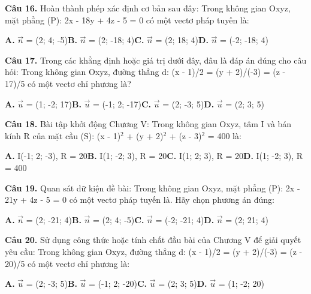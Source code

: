 \documentclass[11pt,a4paper]{article}
\begin{document}
\textbf{\color{primary} Câu 16.} Hoàn thành phép xác định cơ bản sau đây: Trong không gian Oxyz, mặt phẳng (P): 2x - 18y + 4z - 5 = 0 có một vectơ pháp tuyến là:\par
\hspace*{1.5em}\textbf{A.} $\vec{n}$ = (2; 4; -5)\quad\quad \textbf{B.} $\vec{n}$ = (2; -18; 4)\quad\quad \textbf{C.} $\vec{n}$ = (2; 18; 4)\quad\quad \textbf{D.} $\vec{n}$ = (-2; -18; 4)\par\vspace{2pt}
\textbf{\color{primary} Câu 17.} Trong các khẳng định hoặc giá trị dưới đây, đâu là đáp án đúng cho câu hỏi: Trong không gian Oxyz, đường thẳng d: (x - 1)/2 = (y + 2)/(-3) = (z - 17)/5 có một vectơ chỉ phương là?\par
\hspace*{1.5em}\textbf{A.} $\vec{u}$ = (1; -2; 17)\quad\quad \textbf{B.} $\vec{u}$ = (-1; 2; -17)\quad\quad \textbf{C.} $\vec{u}$ = (2; -3; 5)\quad\quad \textbf{D.} $\vec{u}$ = (2; 3; 5)\par\vspace{2pt}
\textbf{\color{primary} Câu 18.} Bài tập khởi động Chương V: Trong không gian Oxyz, tâm I và bán kính R của mặt cầu (S): (x - 1)$^2$ + (y + 2)$^2$ + (z - 3)$^2$ = 400 là:\par
\hspace*{1.5em}\textbf{A.} I(-1; 2; -3), R = 20\quad\quad \textbf{B.} I(1; -2; 3), R = 20\quad\quad \textbf{C.} I(1; 2; 3), R = 20\quad\quad \textbf{D.} I(1; -2; 3), R = 400\par\vspace{2pt}
\textbf{\color{primary} Câu 19.} Quan sát dữ kiện đề bài: Trong không gian Oxyz, mặt phẳng (P): 2x - 21y + 4z - 5 = 0 có một vectơ pháp tuyến là. Hãy chọn phương án đúng:\par
\hspace*{1.5em}\textbf{A.} $\vec{n}$ = (2; -21; 4)\quad\quad \textbf{B.} $\vec{n}$ = (2; 4; -5)\quad\quad \textbf{C.} $\vec{n}$ = (-2; -21; 4)\quad\quad \textbf{D.} $\vec{n}$ = (2; 21; 4)\par\vspace{2pt}
\textbf{\color{primary} Câu 20.} Sử dụng công thức hoặc tính chất đầu bài của Chương V để giải quyết yêu cầu: Trong không gian Oxyz, đường thẳng d: (x - 1)/2 = (y + 2)/(-3) = (z - 20)/5 có một vectơ chỉ phương là:\par
\hspace*{1.5em}\textbf{A.} $\vec{u}$ = (2; -3; 5)\quad\quad \textbf{B.} $\vec{u}$ = (-1; 2; -20)\quad\quad \textbf{C.} $\vec{u}$ = (2; 3; 5)\quad\quad \textbf{D.} $\vec{u}$ = (1; -2; 20)\par\vspace{2pt}
\end{document}
